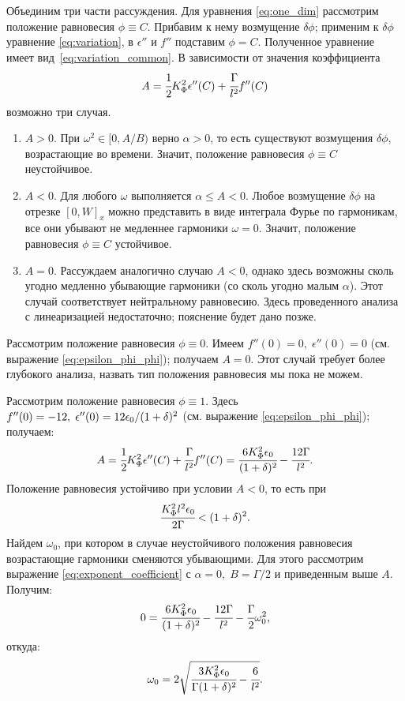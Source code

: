 Объединим три части рассуждения. Для уравнения \eqref{eq:one_dim} рассмотрим положение равновесия $\phi \equiv C$. Прибавим к нему возмущение $\delta \phi$; применим к $\delta \phi$ уравнение \eqref{eq:variation}, в $\epsilon''$ и $f''$ подставим $\phi = C$. Полученное уравнение имеет вид~\eqref{eq:variation_common}. В зависимости от значения коэффициента
$$A = \cfrac{1}{2} K_\Phi^2 \epsilon''(C) + \cfrac{\Gamma}{l^2} f''(C)$$
возможно три случая.
\begin{enumerate}[label=\arabic*.]
	\item $A > 0$. При $\omega^2 \in [0, A / B)$ верно $\alpha > 0$, то есть существуют возмущения $\delta \phi$, возрастающие во времени. Значит, положение равновесия $\phi \equiv C$ неустойчивое.
	\item $A < 0$. Для любого $\omega$ выполняется $\alpha \leqslant A < 0$. Любое возмущение $\delta \phi$ на отрезке $[0, W]_x$ можно представить в виде интеграла Фурье по гармоникам, все они убывают не медленнее гармоники $\omega = 0$. Значит, положение равновесия $\phi \equiv C$ устойчивое.
	\item $A = 0$. Рассуждаем аналогично случаю $A < 0$, однако здесь возможны сколь угодно медленно убывающие гармоники (со сколь угодно малым $\alpha$). Этот случай соответствует нейтральному равновесию. Здесь проведенного анализа с линеаризацией недостаточно; пояснение будет дано позже.
\end{enumerate}

Рассмотрим положение равновесия $\phi \equiv 0$. Имеем $f''(0) = 0, \; \epsilon''(0) = 0$ (см. выражение \eqref{eq:epsilon_phi_phi}); получаем $A = 0$. Этот случай требует более глубокого анализа, назвать тип положения равновесия мы пока не можем.

Рассмотрим положение равновесия $\phi \equiv 1$. Здесь $f''(0) = -12, \; \epsilon''(0) \hm = 12 \epsilon_0 / (1 + \delta)^2$ (см. выражение \eqref{eq:epsilon_phi_phi}); получаем:
$$A = \cfrac{1}{2} K_\Phi^2 \epsilon''(C) + \cfrac{\Gamma}{l^2} f''(C) = \cfrac{6 K_\Phi^2 \epsilon_0}{(1 + \delta)^2} - \cfrac{12 \Gamma}{l^2} {\text{.}}$$
Положение равновесия устойчиво при условии $A < 0$, то есть при
\begin{equation}
	\cfrac{K_\Phi^2 l^2 \epsilon_0}{2 \Gamma} < (1 + \delta)^2 {\text{.}}
	\label{cond:equilibrium_1_stable}
\end{equation}
Найдем $\omega_0$, при котором в случае неустойчивого положения равновесия возрастающие гармоники сменяются убывающими. Для этого рассмотрим выражение \eqref{eq:exponent_coefficient} с $\alpha = 0, \; B = \Gamma / 2$ и приведенным выше $A$. Получим:
$$0 = \cfrac{6 K_\Phi^2 \epsilon_0}{(1 + \delta)^2} - \cfrac{12 \Gamma}{l^2} - \cfrac{\Gamma}{2} \omega_0^2 {\text{,}}$$
откуда:
$$\omega_0 = 2 \sqrt{\cfrac{3 K_\Phi^2 \epsilon_0}{\Gamma (1 + \delta)^2} - \cfrac{6}{l^2}} {\text{.}}$$

